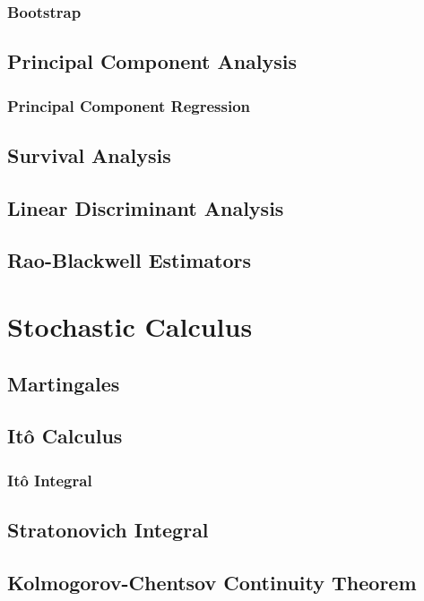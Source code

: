 \documentclass[11pt]{report} %
\begin{document}
\subsection{Bootstrap}

\section{Principal Component Analysis}

\subsection{Principal Component Regression}

\section{Survival Analysis}

\section{Linear Discriminant Analysis}

\section{Rao-Blackwell Estimators}

\chapter{Stochastic Calculus}

\section{Martingales}

\section{It\^{o} Calculus}

\subsection{It\^{o} Integral}

\section{Stratonovich Integral}

\section{Kolmogorov-Chentsov Continuity Theorem}
\end{document}
